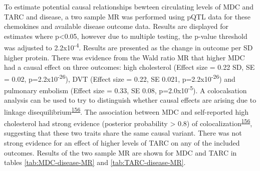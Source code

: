 \documentclass[11pt,twoside]{bristolthesis}
\begin{document}
To estimate potential causal relationships bewteen circulating levels of MDC and TARC and disease, a two sample MR was performed using pQTL data for these chemokines and available disease outcome data. Results are displayed for estimates where p\textless0.05, however due to multiple testing, the p-value threshold was adjusted to 2.2x10\textsuperscript{-4}. Results are presented as the change in outcome per SD higher protein. There was evidence from the Wald ratio MR that higher MDC had a causal effect on three outcomes: high cholesterol (Effect size = 0.22 SD, SE = 0.02, p=2.2x10\textsuperscript{-26}), DVT (Effect size = 0.22, SE 0.021, p=2.2x10\textsuperscript{-26}) and pulmonary embolism (Effect size = 0.33, SE 0.08, p=2.0x10\textsuperscript{-5}). A colocalsation analysis can be used to try to distinguish whether causal effects are arising due to linkage disequilibrium\textsuperscript{\protect\hyperlink{ref-Zheng2020}{156}}. The association between MDC and self-reported high cholesterol had strong evidence (posterior probability \textgreater{} 0.8) of colocalization\textsuperscript{\protect\hyperlink{ref-Zheng2020}{156}}, suggesting that these two traits share the same causal variant. There was not strong evidence for an effect of higher levels of TARC on any of the included outcomes. Results of the two sample MR are shown for MDC and TARC in tables \ref{tab:MDC-disease-MR} and \ref{tab:TARC-disease-MR}.
\end{document}
